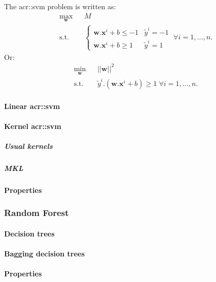             The \gls{acr::svm} problem is written as:
            \begin{equation*}
                \begin{aligned}
					& \max_{\bm{w}}
					& & M \\
					& \text{s.t.}
					& & \begin{cases}
						\bm{w}.\bm{x}^i + b \leq -1 & \tilde{y}^i = -1 \\
						\bm{w}.\bm{x}^i + b \geq 1 & \tilde{y}^i = 1
					\end{cases} \; \forall i = 1, \dots, n.
				\end{aligned}
            \end{equation*}
            Or:
            \begin{equation}
                \label{eq::separable_svm_primal}
                \begin{aligned}
					& \min_{\bm{w}}
					& & {\vert\vert \bm{w} \vert\vert}^2 \\
					& \text{s.t.}
					& & \tilde{y}^i.(\bm{w}.\bm{x}^i + b) \geq 1 \; \forall i = 1, \dots, n.
				\end{aligned}
            \end{equation}

            \paragraph{Linear \acrshort*{acr::svm}}
            \paragraph{Kernel \acrshort*{acr::svm}}
                \subparagraph{Usual kernels}
                \subparagraph{MKL}
            \paragraph{Properties}
        \subsubsection{Random Forest}
            \paragraph{Decision trees}
            \paragraph{Bagging decision trees}
            \paragraph{Properties}
